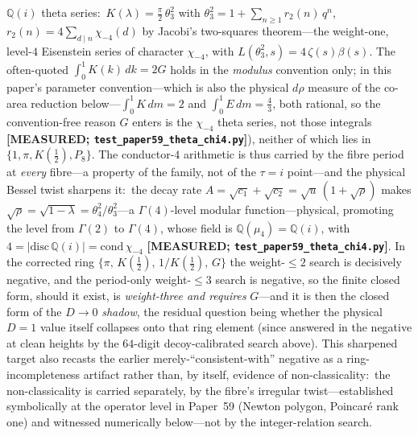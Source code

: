 \documentclass[aps,pra,twocolumn,superscriptaddress,longbibliography]{revtex4-2}
\begin{document}
$\mathbb{Q}(i)$ theta series:\ $K(\lambda)=\tfrac{\pi}{2}\,\theta_{3}^{2}$ with
$\theta_{3}^{2}=1+\sum_{n\ge1}r_{2}(n)\,q^{n}$, $r_{2}(n)=4\sum_{d\mid n}\chi_{-4}(d)$ by
Jacobi's two-squares theorem---the weight-one, level-$4$ Eisenstein series of character
$\chi_{-4}$, with $L(\theta_{3}^{2},s)=4\,\zeta(s)\beta(s)$.  The often-quoted
$\int_{0}^{1}K(k)\,dk=2G$ holds in the \emph{modulus} convention only; in this paper's
parameter convention---which is also the physical $d\rho$ measure of the co-area
reduction below---$\int_{0}^{1}K\,dm=2$ and $\int_{0}^{1}E\,dm=\tfrac43$, both rational,
so the convention-free reason $G$ enters is the $\chi_{-4}$ theta series, not those
integrals \textbf{[MEASURED; \texttt{test\_paper59\_theta\_chi4.py}]}), neither of which
lies in $\{1,\pi,K(\tfrac12),P_{8}\}$.  The conductor-$4$ arithmetic is thus carried by
the fibre period at \emph{every} fibre---a property of the family, not of the $\tau=i$
point---and the physical Bessel twist sharpens it:\ the decay rate
$A=\sqrt{c_{1}}+\sqrt{c_{2}}=\sqrt{u}\,(1+\sqrt{\rho})$ makes
$\sqrt{\rho}=\sqrt{1-\lambda}=\theta_{4}^{2}/\theta_{3}^{2}$---a $\Gamma(4)$-level
modular function---physical, promoting the level from $\Gamma(2)$ to $\Gamma(4)$, whose
field is $\mathbb{Q}(\mu_{4})=\mathbb{Q}(i)$, with $4=|\mathrm{disc}\,\mathbb{Q}(i)|
=\mathrm{cond}\,\chi_{-4}$ \textbf{[MEASURED; \texttt{test\_paper59\_theta\_chi4.py}]}.
In the corrected ring
$\{\pi,\,K(\tfrac12),\,1/K(\tfrac12),\,G\}$ the weight-$\le2$ search is decisively
negative, and the period-only weight-$\le3$ search is negative, so the finite closed
form, should it exist, is \emph{weight-three and requires} $G$---and it is then the closed form of
the $D\to0$ \emph{shadow}, the residual question being whether the physical $D=1$ value itself
collapses onto that ring element (since answered in the negative at clean heights by the
$64$-digit decoy-calibrated search above).  This
sharpened target also recasts the earlier merely-``consistent-with'' negative as a
ring-incompleteness artifact rather than, by itself, evidence of non-classicality:\ the
non-classicality is carried separately, by the fibre's irregular twist---established
symbolically at the operator level in Paper~59
(Newton polygon, Poincar\'e rank one) and witnessed numerically below---not by the
integer-relation search.
\end{document}
